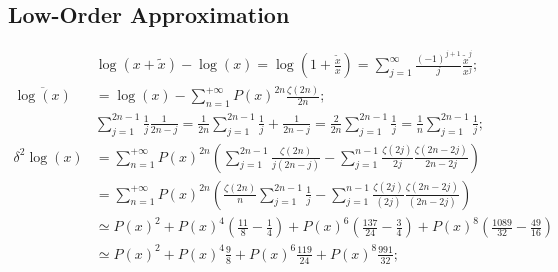 \documentclass[twoside]{article}
\numberwithin{equation}{section}
\begin{document}
\subsection{Low-Order Approximation}

\iffalse

\begin{align*}
& \log(x + \tilde{x}) - \log(x) = \log(1 + \frac{\tilde{x}}{x}) = \sum_{j=1}^{\infty} \frac{(-1)^{j+1}}{j} \frac{\tilde{x}^j}{x^j}; \\
\overline{\log(x)}  &= \log(x) -\sum_{n=1}^{+\infty} P(x)^{2n} \frac{\zeta(2n)}{2n}; \\
&\sum_{j=1}^{2n-1} \frac{1}{j} \frac{1}{2n - j} = \frac{1}{2n} \sum_{j=1}^{2n-1} \frac{1}{j} +  \frac{1}{2n - j} = \frac{2}{2n} \sum_{j=1}^{2n-1} \frac{1}{j}
 = \frac{1}{n} \sum_{j=1}^{2n-1} \frac{1}{j}; \\
\delta^2 \log(x) &= \sum_{n=1}^{+\infty} P(x)^{2n} \left(\sum_{j=1}^{2n-1} \frac{\zeta(2n)}{j (2n-j)}
   - \sum_{j=1}^{n-1} \frac{\zeta(2j)}{2j} \frac{\zeta(2n - 2j)}{2n - 2j} \right) \\
 &= \sum_{n=1}^{+\infty} P(x)^{2n} \left(\frac{\zeta(2n)}{n} \sum_{j=1}^{2n-1} \frac{1}{j} 
     - \sum_{j=1}^{n-1} \frac{\zeta(2j)}{(2j)} \frac{\zeta(2n - 2j)}{(2n - 2j)} \right) \\
 &\simeq P(x)^2 + P(x)^4 (\frac{11}{8} - \frac{1}{4}) + P(x)^6 (\frac{137}{24} - \frac{3}{4}) + P(x)^8 (\frac{1089}{32} - \frac{49}{16}) \\
 &\simeq P(x)^2 + P(x)^4 \frac{9}{8}  + P(x)^6 \frac{119}{24} + P(x)^8 \frac{991}{32};
\end{align*}
\end{document}

